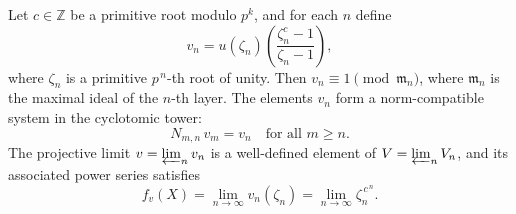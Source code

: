 Let $c \in \mathbb{Z}$ be a primitive root modulo $p^k$, and for each $n$ define
$$v_n = u(\zeta_n)\left(\frac{\zeta_n^{c} - 1}{\zeta_n - 1}\right),$$
where $\zeta_n$ is a primitive $p^{\,n}$-th root of unity. Then $v_n \equiv 1 \pmod{\mathfrak{m}_n}$, where $\mathfrak{m}_n$ is the maximal ideal of the $n$-th layer. The elements $v_n$ form a norm-compatible system in the cyclotomic tower:
$$N_{m,n} \, v_m = v_n \quad \text{for all } m \ge n.$$
The projective limit $v = \varprojlim_n v_n$ is a well-defined element of $V = \varprojlim_n V_n$, and its associated power series satisfies
$$f_v(X) = \lim_{n \to \infty} v_n(\zeta_n) = \lim_{n \to \infty} \zeta_n^{\,c^{\,n}}.$$

